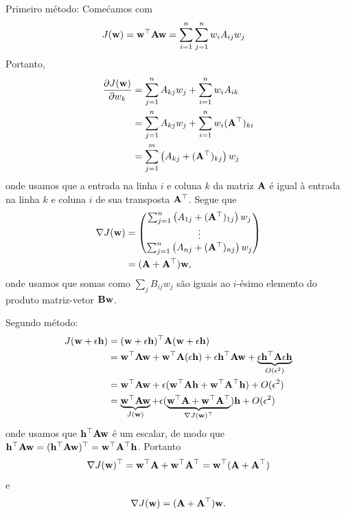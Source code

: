 \begin{exenumerate}
    \begin{solution}
        Primeiro m\'etodo: Come\'camos com
        \begin{align}
            J(\mathbf{w}) &= \mathbf{w}^\top\mathbf{A}\mathbf{w} = \sum_{i=1}^n \sum_{j=1}^n w_iA_{ij}w_j
        \end{align}
        Portanto,
        \begin{align}
            \frac{\partial{J(\mathbf{w})}}{\partial{w_k}} &= \sum_{j=1}^n A_{kj}w_j + \sum_{i=1}^n w_i A_{ik} \\
            &= \sum_{j=1}^n A_{kj}w_j + \sum_{i=1}^n w_i (\mathbf{A}^\top)_{ki}\\
            &= \sum_{j=1}^m \left(A_{kj}+(\mathbf{A}^\top)_{kj}\right)w_j
        \end{align}
        onde usamos que a entrada na linha $i$ e coluna $k$ da matriz $\mathbf{A}$ \'e igual \`a entrada na linha $k$ e coluna $i$ de sua transposta $\mathbf{A}^\top$. Segue que
        \begin{align}
            \nabla J(\mathbf{w}) &=
            \begin{pmatrix}
                \sum_{j=1}^n  \left(A_{1j}+(\mathbf{A}^\top)_{1j}\right)w_j\\
                \vdots \\
                \sum_{j=1}^n  \left(A_{nj}+(\mathbf{A}^\top)_{nj}\right)w_j
            \end{pmatrix} \\
            &= (\mathbf{A}+\mathbf{A}^\top)\mathbf{w},
        \end{align}
        onde usamos que somas como $\sum_j B_{ij} w_j$ s\~ao iguais ao $i$-\'esimo elemento do produto matriz-vetor $\mathbf{B} \mathbf{w}$.
        
        Segundo m\'etodo:
        \begin{align}
            J(\mathbf{w} + \epsilon\mathbf{h}) &= (\mathbf{w} + \epsilon\mathbf{h})^\top \mathbf{A}(\mathbf{w} + \epsilon\mathbf{h}) \\
            &= \mathbf{w}^\top\mathbf{A}\mathbf{w} + \mathbf{w}^\top\mathbf{A}(\epsilon\mathbf{h}) + \epsilon\mathbf{h}^\top\mathbf{A}\mathbf{w} +
            \underbrace{\epsilon\mathbf{h}^\top \mathbf{A}\epsilon\mathbf{h}}_{O(\epsilon^2)} \\
            &= \mathbf{w}^\top\mathbf{A}\mathbf{w} + \epsilon(\mathbf{w}^\top\mathbf{A}\mathbf{h} + \mathbf{w}^\top\mathbf{A}^\top\mathbf{h}) + O(\epsilon^2) \\
            &= \underbrace{\mathbf{w}^\top\mathbf{A}\mathbf{w}}_{J(\mathbf{w})} +\epsilon(\underbrace{\mathbf{w}^\top\mathbf{A} + \mathbf{w}^\top\mathbf{A}^\top}_{\nabla J(\mathbf{w})^\top})\mathbf{h} + O(\epsilon^2)
        \end{align}
        onde usamos que $\mathbf{h}^\top\mathbf{A}\mathbf{w}$ \'e um escalar, de modo que $\mathbf{h}^\top\mathbf{A}\mathbf{w} = (\mathbf{h}^\top\mathbf{A}\mathbf{w})^\top = \mathbf{w}^\top \mathbf{A}^\top \mathbf{h}$. Portanto
        \begin{equation}
            \nabla J(\mathbf{w})^\top = \mathbf{w}^\top\mathbf{A} + \mathbf{w}^\top\mathbf{A}^\top = \mathbf{w}^\top(\mathbf{A}+\mathbf{A}^\top)
        \end{equation}
        e
        \begin{equation}
            \nabla J(\mathbf{w}) = (\mathbf{A} + \mathbf{A}^\top)\mathbf{w}.
        \end{equation}
    \end{solution}
    

\end{exenumerate}
